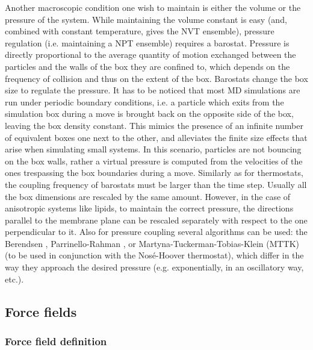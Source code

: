 \documentclass[graybox]{svmult}
\begin{document}
Another macroscopic condition one wish to maintain is either the volume or the pressure of the system. While maintaining the volume constant is easy (and, combined with constant temperature, gives the NVT ensemble), pressure regulation (i.e. maintaining a NPT ensemble) requires a barostat.
%
Pressure is directly proportional to the average quantity of motion exchanged between the particles and the walls of the box they are confined to, which depends on the frequency of collision and thus on the extent of the box. Barostats change the box size to regulate the pressure.
%
It has to be noticed that most MD simulations are run under periodic boundary conditions, i.e. a particle which exits from the simulation box during a move is brought back on the opposite side of the box, leaving the box density constant. This mimics the presence of an infinite number of equivalent boxes one next to the other, and alleviates the finite size effects that arise when simulating small systems.
%
In this scenario, particles are not bouncing on the box walls, rather a virtual pressure is computed from the velocities of the ones trespassing the box boundaries during a move.
%
Similarly as for thermostats, the coupling frequency of barostats must be larger than the time step. Usually all the box dimensions are rescaled by the same amount. However, in the case of anisotropic systems like lipids, to maintain the correct pressure, the directions parallel to the membrane plane can be rescaled separately with respect to the one perpendicular to it.
%
Also for pressure coupling several algorithms can be used: the Berendsen \cite{Berendsen1984},
Parrinello-Rahman \cite{Parrinello1981},
or Martyna-Tuckerman-Tobias-Klein (MTTK) \cite{Martyna1996} (to be used in conjunction with the Nos\'{e}-Hoover thermostat), which differ in the way they approach the desired pressure (e.g. exponentially, in an oscillatory way, etc.).


\subsection{Force fields} 

\subsubsection{Force field definition} \label{sec:ff}
\end{document}
